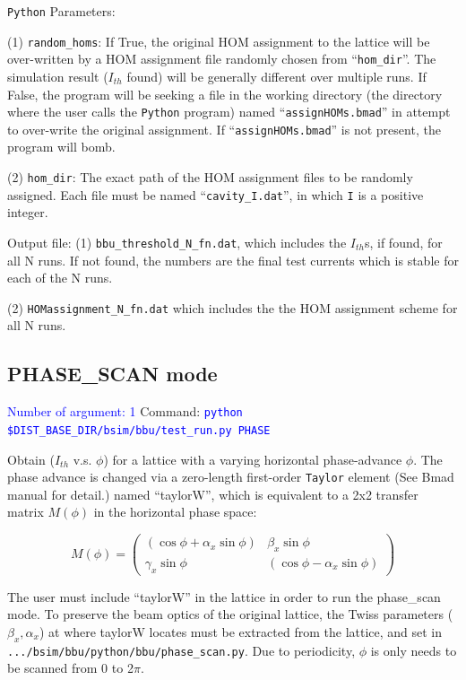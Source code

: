 \documentclass{hitec}
\begin{document}
\bigbreak
\texttt{Python} Parameters:

(1) \texttt{random_homs}: If True, the original HOM assignment to the lattice will be over-written by a HOM assignment file  randomly chosen from ``\texttt{hom_dir}''.
The simulation result ($I_{th}$ found) will be generally different over multiple runs. 
If False, the program will be seeking a file in the working directory (the directory where the user calls the \texttt{Python} program) named ``\texttt{assignHOMs.bmad}'' in attempt to over-write the original assignment. If ``\texttt{assignHOMs.bmad}'' is not present, the program will bomb.

(2) \texttt{hom_dir}:
The exact path of the HOM assignment files to be randomly assigned. Each file must be named ``\texttt{cavity_I.dat}'', in which \texttt{I} is a positive integer.

\bigbreak
Output file:  
(1) \texttt{bbu_threshold_N_fn.dat}, which includes the $I_{th}$s, if found, for all N runs. If not found, the numbers are the final test currents which is stable for each of the N runs. 

(2) \texttt{HOMassignment_N_fn.dat} which includes the the HOM assignment scheme for all N runs.

\subsection{PHASE_SCAN mode}
\textcolor{blue}{Number of argument: 1}
\bigbreak
Command:  \textcolor{blue}{\texttt{python \$DIST_BASE_DIR/bsim/bbu/test_run.py  PHASE}}

Obtain ($I_{th}$ v.s. $\phi$) for a lattice with a varying horizontal phase-advance $\phi$. The phase advance is changed via a zero-length first-order \texttt{Taylor} element (See Bmad manual for detail.) named ``taylorW'', which is equivalent to a 2x2 transfer matrix $M(\phi)$ in the horizontal phase space:

\[
M(\phi) =
\begin{pmatrix}
   (\cos\phi+\alpha_{x}\sin\phi) & \beta_{x}\sin\phi \\ 
  \gamma_{x}\sin\phi &  (\cos\phi-\alpha_{x}\sin\phi)
\end{pmatrix}
\]


The user must include ``taylorW'' in the lattice in order to run the phase_scan mode. To preserve the beam optics of the original lattice, the Twiss parameters ($\beta_x, \alpha_x$) at where taylorW locates must be extracted from the lattice, and set in \texttt{.../bsim/bbu/python/bbu/phase_scan.py}. Due to periodicity, $\phi$ is only needs to be scanned from 0 to 2$\pi$.
       
\end{document}
